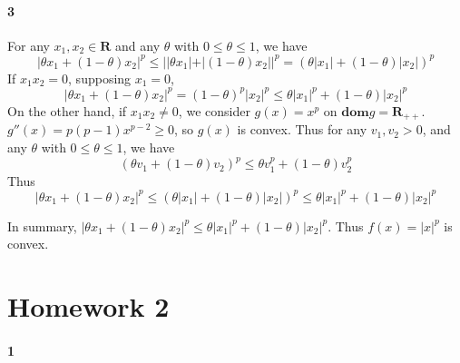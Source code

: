 \documentclass{article}
\begin{document}
\paragraph{3}
For any $x_1, x_2 \in \mathbf{R} $ and any $\theta$ with $0\leq \theta \leq 1$, we have
\[
|\theta x_1 + (1-\theta)x_2|^p \leq ||\theta x_1| + |(1-\theta)x_2||^p = (\theta|x_1| + (1-\theta)|x_2|)^p
\]
If $x_1x_2=0$, supposing $x_1=0$,
\[
|\theta x_1 + (1-\theta)x_2|^p = (1-\theta)^p|x_2|^p \leq \theta |x_1|^p + (1-\theta)|x_2|^p
\]
On the other hand, if $x_1x_2\ne0$, we consider $g(x)=x^p$ on $\mathbf{dom}g=\mathbf{R}_{++}$. $g''(x) = p(p-1)x^{p-2} \ge 0$, so $g(x)$ is convex. Thus for any $v_1, v_2>0$, and any $\theta$ with $0\leq \theta \leq 1$, we have
\[
(\theta v_1 + (1-\theta)v_2)^p \le \theta v_1^p + (1-\theta)v_2^p 
\]
Thus 
\[
|\theta x_1 + (1-\theta)x_2|^p \le (\theta|x_1| + (1-\theta)|x_2|)^p \le \theta |x_1|^p + (1-\theta)|x_2|^p 
\]

In summary, $|\theta x_1 + (1-\theta)x_2|^p \le \theta |x_1|^p + (1-\theta)|x_2|^p $. Thus $f(x) = |x|^p$ is convex.

\section{Homework 2}
\paragraph{1}

	
	
	
	
	
	
	
	
\end{document}
